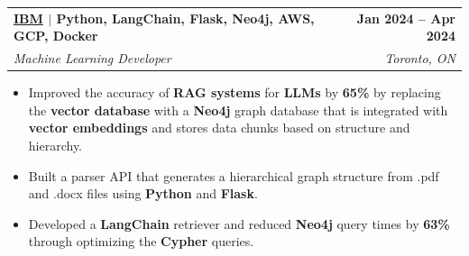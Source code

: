 \documentclass[letterpaper,11pt]{article}
\makeatletter
\newcommand{\resumeItem}[1]{
  \item\small{
    {#1 \vspace{-3pt}}
  }
}
\newcommand{\resumeSubheading}[4]{
  \vspace{-2pt}\item
    \begin{tabular*}{1.0\textwidth}[t]{l@{\extracolsep{\fill}}r}
      \textbf{#1} & \textbf{\small #2} \\
      \textit{\small#3} & \textit{\small #4} \\
    \end{tabular*}\vspace{-7pt}
}
\newcommand{\resumeItemListStart}{\begin{itemize}[leftmargin=0.2in]}
\newcommand{\resumeItemListEnd}{\end{itemize}\vspace{-5pt}}
\makeatother
\begin{document}

    \resumeSubheading
      {{\href{https://www.ibm.com/ca-en}{\textcolor{NavyBlue}{IBM}}} $|$ \textnormal{Python, LangChain, Flask, Neo4j, AWS, GCP, Docker}}{Jan 2024 -- Apr 2024}
      {Machine Learning Developer}{Toronto, ON}
      \resumeItemListStart
        \resumeItem{Improved the accuracy of \textbf{RAG systems} for \textbf{LLMs} by \textbf{65\%} by replacing the \textbf{vector database} with a \textbf{Neo4j} graph database that is integrated with \textbf{vector embeddings} and stores data chunks based on structure and hierarchy.}
        \resumeItem{Built a parser API that generates a hierarchical graph structure from .pdf and .docx files using \textbf{Python} and \textbf{Flask}.}
        \resumeItem{Developed a \textbf{LangChain} retriever and reduced \textbf{Neo4j} query times by \textbf{63\%} through optimizing the \textbf{Cypher} queries.}
      \resumeItemListEnd

\end{document}

